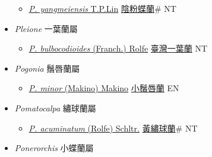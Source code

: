 \begin{itemize}
\begin{itemize}
        \item[] \href{http://www.theplantlist.org/tpl1.1/search?q=Platanthera+yangmeiensis}{\textit{P. yangmeiensis} T.P.Lin}   \href{\detokenize{http://taibnet.sinica.edu.tw/chi/taibnet_species_list.php?T2=陰粉蝶蘭&T2_new_value=true&fr=y}}{陰粉蝶蘭}\# NT
  \end{itemize}
 \item[] \textit{Pleione} 一葉蘭屬
                    
  \begin{itemize}
        \item[] \href{http://www.theplantlist.org/tpl1.1/search?q=Pleione+bulbocodioides}{\textit{P. bulbocodioides} (Franch.) Rolfe}   \href{\detokenize{http://taibnet.sinica.edu.tw/chi/taibnet_species_list.php?T2=臺灣一葉蘭&T2_new_value=true&fr=y}}{臺灣一葉蘭} NT
  \end{itemize}
 \item[] \textit{Pogonia} 鬚唇蘭屬
                    
  \begin{itemize}
        \item[] \href{http://www.theplantlist.org/tpl1.1/search?q=Pogonia+minor}{\textit{P. minor} (Makino) Makino}   \href{\detokenize{http://taibnet.sinica.edu.tw/chi/taibnet_species_list.php?T2=小鬚唇蘭&T2_new_value=true&fr=y}}{小鬚唇蘭} EN
  \end{itemize}
 \item[] \textit{Pomatocalpa} 繡球蘭屬
                    
  \begin{itemize}
        \item[] \href{http://www.theplantlist.org/tpl1.1/search?q=Pomatocalpa+acuminatum}{\textit{P. acuminatum} (Rolfe) Schltr.}     \href{\detokenize{http://taibnet.sinica.edu.tw/chi/taibnet_species_list.php?T2=黃繡球蘭&T2_new_value=true&fr=y}}{黃繡球蘭}\# NT
  \end{itemize}
 \item[] \textit{Ponerorchis} 小蝶蘭屬
                    

\end{itemize}
